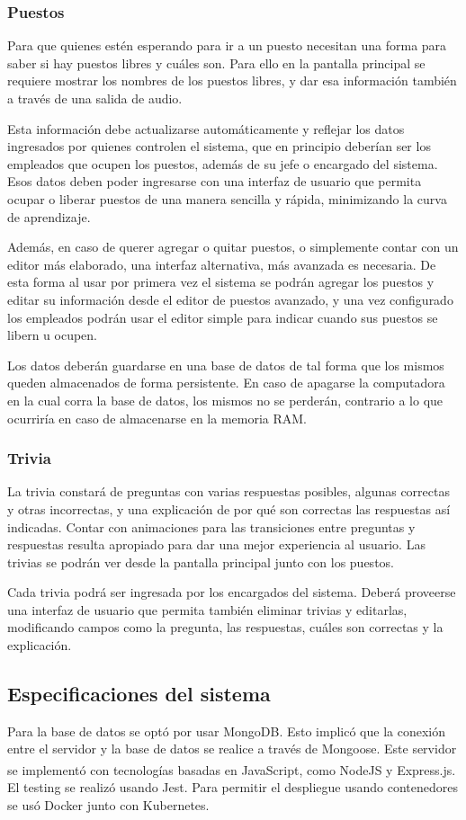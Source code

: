 \documentclass{article}
\begin{document}
\subsubsection{Puestos}
Para que quienes estén esperando para ir a un puesto necesitan una forma para saber si hay puestos libres y cuáles son. Para ello en la pantalla principal se requiere mostrar los nombres de los puestos libres, y dar esa información también a través de una salida de audio.

Esta información debe actualizarse automáticamente y reflejar los datos ingresados por quienes controlen el sistema, que en principio deberían ser los empleados que ocupen los puestos, además de su jefe o encargado del sistema. Esos datos deben poder ingresarse con una interfaz de usuario que permita ocupar o liberar puestos de una manera sencilla y rápida, minimizando la curva de aprendizaje. 

Además, en caso de querer agregar o quitar puestos, o simplemente contar con un editor más elaborado, una interfaz alternativa, más avanzada es necesaria. De esta forma al usar por primera vez el sistema se podrán agregar los puestos y editar su información desde el editor de puestos avanzado, y una vez configurado los empleados podrán usar el editor simple para indicar cuando sus puestos se libern u ocupen.

Los datos deberán guardarse en una base de datos de tal forma que los mismos queden almacenados de forma persistente. En caso de apagarse la computadora en la cual corra la  base de datos, los mismos no se perderán, contrario a lo que ocurriría en caso de almacenarse en la memoria RAM.
\subsubsection{Trivia}
La trivia constará de preguntas con varias respuestas posibles, algunas correctas y otras incorrectas, y una explicación de por qué son correctas las respuestas así indicadas. Contar con animaciones para las transiciones entre preguntas y respuestas resulta apropiado para dar una mejor experiencia al usuario. Las trivias se podrán ver desde la pantalla principal junto con los puestos.

Cada trivia podrá ser ingresada por los encargados del sistema. Deberá proveerse una interfaz de usuario que permita también eliminar trivias y editarlas, modificando campos como la pregunta, las respuestas, cuáles son correctas y la explicación.
\subsection{Especificaciones del sistema}
Para la base de datos se optó por usar MongoDB. Esto implicó que la conexión entre el servidor y la base de datos se realice a través de Mongoose. Este servidor se implementó con tecnologías basadas en JavaScript, como NodeJS\textsuperscript{\textregistered} y Express.js. El testing se realizó usando Jest. Para permitir el despliegue usando contenedores se usó Docker junto con Kubernetes.
\end{document}
